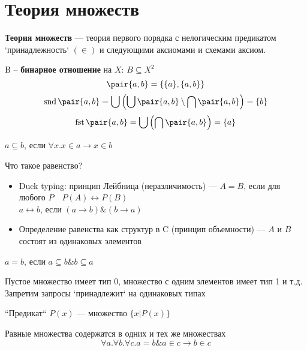 \documentclass[oneside]{book}
\begin{document}
\section{Теория множеств}
\label{sec:orgd137c3d}
\begin{definition}
	\textbf{Теория множеств} --- теория первого порядка с нелогическим предикатом `принадлежность` \((\in)\) и следующими аксиомами и схемами аксиом.
	\label{org206dbfb}
\end{definition}
\begin{definition}
	B -- \textbf{бинарное отношение} на \(X\): \(B \subseteq X^2\)
	\[ \pair{a, b} = \{\{a\}, \{a, b\}\} \]
	\[ \mathop{\rm snd}\pair{a, b} = \bigcup\left(\bigcup \pair{a, b} \setminus \bigcap \pair{a, b}\right) = \{b\} \]
	\[ \mathop{\rm fst}\pair{a, b} = \bigcup\left(\bigcap \pair{a, b}\right) = \{a\} \]
	\label{orga671f6a}
\end{definition}
\begin{definition}
	\(a \subseteq b\), если \(\forall x. x \in a \to x \in b\)
	\label{org4550add}
\end{definition}
\begin{remark}
	Что такое равенство?
	\begin{itemize}
		\item Duck typing: принцип Лейбница (неразличимость) --- \(A = B\), если для любого \(P \quad P(A) \leftrightarrow P(B)\) \\
		      \(a \leftrightarrow b\), если \((a \to b)\&(b \to a)\)
		\item Определение равенства как структур в C (принцип объемности) --- \(A\) и \(B\) состоят из одинаковых элементов
	\end{itemize}
\end{remark}
\begin{definition}
	\(a = b\), если \(a \subseteq b \& b \subseteq a\)
	\label{orga66370b}
\end{definition}
\begin{remark}
	Пустое множество имеет тип 0, множество с одним элементов имеет тип 1 и т.д. Запретим запросы `принадлежит` на одинаковых типах
\end{remark}
\begin{definition}
	``Предикат`` \(P(x)\) --- множество \(\{x \big| P(x)\}\)
	\label{orga3fcc16}
\end{definition}
\begin{axiom}[равенства]
	Равные множества содержатся в одних и тех же множествах
	\[ \forall a.\forall b.\forall c. a = b\&a\in c\to b \in c \]
	\label{org617ebc4}
\end{axiom}
\end{document}
